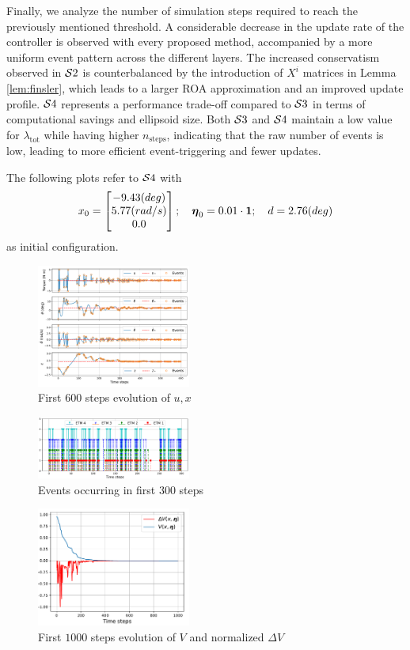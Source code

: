 \documentclass{ifacconf}
\theoremstyle{plain}
\begin{document}
Finally, we analyze the number of simulation steps required to reach the previously mentioned threshold. A considerable decrease in the update rate of the controller is observed with every proposed method, accompanied by a more uniform event pattern across the different layers. The increased conservatism observed in ${\mathcal{S}} 2$ is counterbalanced by the introduction of $X^i$ matrices in Lemma \ref{lem:finsler}, which leads to a larger ROA approximation and an improved update profile. ${\mathcal{S}} 4$ represents a performance trade-off compared to ${\mathcal{S}} 3$ in terms of computational savings and ellipsoid size. Both ${\mathcal{S}} 3$ and ${\mathcal{S}} 4$ maintain a low value for $\lambda_{\text{tot}}$ while having higher $n_{\text{steps}}$, indicating that the raw number of events is low, leading to more efficient event-triggering and fewer updates.

The following plots refer to ${\mathcal{S}} 4$ with $$
x_0 = \left[\begin{matrix}-9.43(deg) \\ 5.77(rad/s) \\  0.0\end{matrix}\right]; \quad \boldsymbol{\eta}_0 = 0.01 \cdot \operatorname{\mathbf{1}}; \quad d = 2.76(deg)$$ 
as initial configuration.

\begin{figure}[H]
    \centering
    \includegraphics[width=0.45\textwidth]{Figures/evolution_plot}
    \caption{First $600$ steps evolution of $u, x$}
    \label{fig:evolution}
\end{figure}

\begin{figure}[H]
    \centering
    \includegraphics[width=0.45\textwidth]{Figures/event_plot}
    \caption{Events occurring in first $300$ steps}
    \label{fig:events}
\end{figure}

\begin{figure}[H]
    \centering
    \includegraphics[width=0.45\textwidth]{Figures/lyapunov_plot}
    \caption{First $1000$ steps evolution of $V$ and normalized $\Delta V$}
    \label{fig:lyapunov}
\end{figure}
\end{document}
